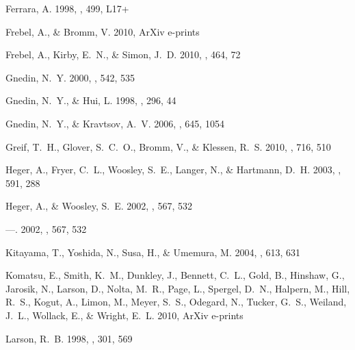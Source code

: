 \documentclass{PoS}
\begin{document}
\begin{thebibliography}{50}
{Ferrara}, A. 1998, \apjl, 499, L17+

{Frebel}, A., \& {Bromm}, V. 2010, ArXiv e-prints

{Frebel}, A., {Kirby}, E.~N., \& {Simon}, J.~D. 2010, \nat, 464, 72

{Gnedin}, N.~Y. 2000, \apj, 542, 535

{Gnedin}, N.~Y., \& {Hui}, L. 1998, \mnras, 296, 44

{Gnedin}, N.~Y., \& {Kravtsov}, A.~V. 2006, \apj, 645, 1054

{Greif}, T.~H., {Glover}, S.~C.~O., {Bromm}, V., \& {Klessen}, R.~S. 2010,
  \apj, 716, 510

{Heger}, A., {Fryer}, C.~L., {Woosley}, S.~E., {Langer}, N., \& {Hartmann},
  D.~H. 2003, \apj, 591, 288

{Heger}, A., \& {Woosley}, S.~E. 2002{}, \apj, 567, 532

---. 2002{}, \apj, 567, 532

{Kitayama}, T., {Yoshida}, N., {Susa}, H., \& {Umemura}, M. 2004, \apj, 613,
  631

{Komatsu}, E., {Smith}, K.~M., {Dunkley}, J., {Bennett}, C.~L., {Gold}, B.,
  {Hinshaw}, G., {Jarosik}, N., {Larson}, D., {Nolta}, M.~R., {Page}, L.,
  {Spergel}, D.~N., {Halpern}, M., {Hill}, R.~S., {Kogut}, A., {Limon}, M.,
  {Meyer}, S.~S., {Odegard}, N., {Tucker}, G.~S., {Weiland}, J.~L., {Wollack},
  E., \& {Wright}, E.~L. 2010, ArXiv e-prints

{Larson}, R.~B. 1998, \mnras, 301, 569


\end{thebibliography}
\end{document}
